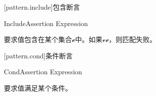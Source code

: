 [pattern.include]{包含断言}

\begin{bnf}{IncludeAssertion}
     Expression
\end{bnf}

\pnum
{}要求值包含在某个集合$\mathcal{e}$中。如果$\mathcal{v}$$\mathcal{e}$，则匹配失败。

[pattern.cond]{条件断言}

\begin{bnf}{CondAssertion}
     Expression
\end{bnf}

\pnum
{}要求值满足某个条件。